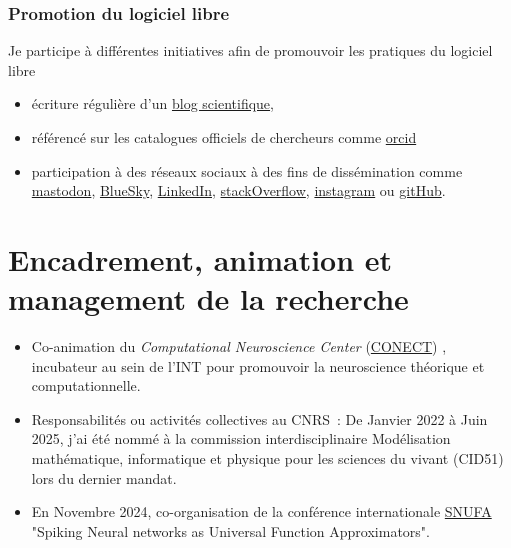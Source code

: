 \documentclass[10pt,french,a4paper,oneside]{article}%
\begin{document}
\subsubsection{Promotion du logiciel libre} %
Je participe à différentes initiatives afin de promouvoir les pratiques du logiciel libre
\begin{itemize}
	\item écriture régulière d'un \href{https://laurentperrinet.github.io/sciblog/}{blog scientifique},
	\item référencé sur les catalogues officiels de chercheurs comme \href{http://orcid.org/0000-0002-9536-010X}{orcid}
	\item participation à des réseaux sociaux à des fins de dissémination comme \href{https://neuromatch.social/@laurentperrinet}{mastodon}, \href{https://bsky.app/profile/laurentperrinet.bsky.social}{BlueSky}, \href{https://www.linkedin.com/in/laurent-perrinet-1857b9/}{LinkedIn}, \href{https://stackoverflow.com/users/234547/meduz}{stackOverflow}, \href{https://www.instagram.com/laurentperrinet/}{instagram} ou \href{https://github.com/laurentperrinet}{gitHub}.
\end{itemize}




\section{Encadrement, animation et management de la recherche}



\begin{itemize}
	
	\item Co-animation du \og \textit{Computational Neuroscience Center} (\href{https://conect-int.github.io/}{CONECT}) \fg{}, incubateur au sein de l'INT pour promouvoir la neuroscience théorique et computationnelle.
	
    \item Responsabilités ou activités collectives au CNRS~: De Janvier 2022 à Juin 2025, j'ai été nommé à la commission interdisciplinaire \og Modélisation mathématique, informatique et physique pour les sciences du vivant \fg{} (CID51) lors du dernier mandat.
	
	\item En Novembre 2024, co-organisation de la conférence internationale \href{https://laurentperrinet.github.io/post/2024-11-08-snufa/}{SNUFA} "Spiking Neural networks as Universal Function Approximators".
\end{itemize}
\end{document}
